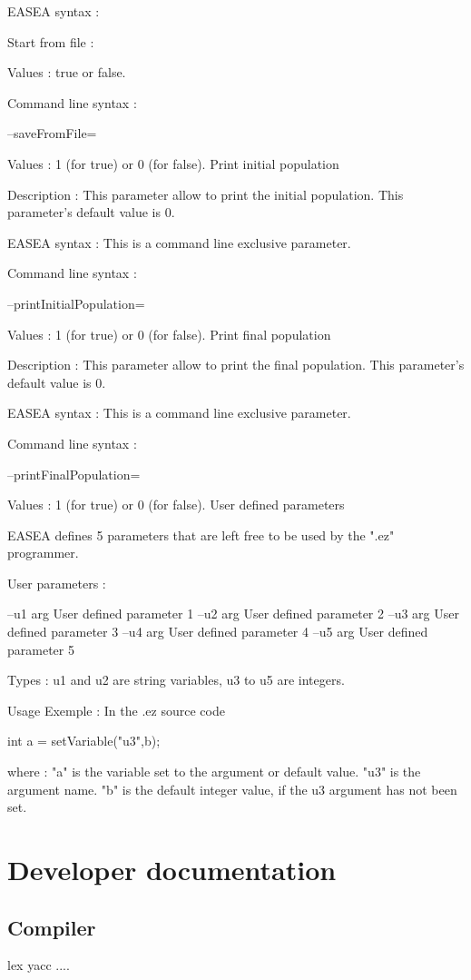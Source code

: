 \documentclass{article}
\begin{document}
EASEA syntax :

Start from file :

Values : true or false.

Command line syntax :

--saveFromFile=

Values : 1 (for true) or 0 (for false).
Print initial population

Description :
This parameter allow to print the initial population. This parameter's default value is 0.

EASEA syntax :
This is a command line exclusive parameter.

Command line syntax :

--printInitialPopulation=

Values : 1 (for true) or 0 (for false).
Print final population

Description :
This parameter allow to print the final population. This parameter's default value is 0.

EASEA syntax :
This is a command line exclusive parameter.

Command line syntax :

--printFinalPopulation=

Values : 1 (for true) or 0 (for false).
User defined parameters

EASEA defines 5 parameters that are left free to be used by the ".ez" programmer.

User parameters :

 --u1 arg                      User defined parameter 1
 --u2 arg                      User defined parameter 2
 --u3 arg                      User defined parameter 3
 --u4 arg                      User defined parameter 4
 --u5 arg                      User defined parameter 5

Types : u1 and u2 are string variables, u3 to u5 are integers.

Usage Exemple : In the .ez source code

  int a = setVariable("u3",b);

where :
"a" is the variable set to the argument or default value.
"u3" is the argument name.
"b" is the default integer value, if the u3 argument has not been set. 

\section{Developer documentation} %
\label{sec:Developer documentation}
\subsection{Compiler} %
\label{sub:Compiler}
  lex yacc .... 
\end{document}
